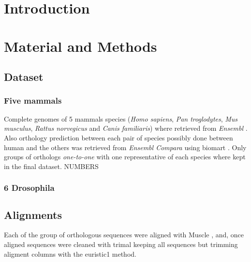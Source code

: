 

\section{Introduction}

\section{Material and Methods}

\subsection{Dataset}

\subsubsection{Five mammals}

Complete genomes of 5 mammals species (\textit{Homo sapiens}, \textit{Pan troglodytes}, \textit{Mus musculus}, \textit{Rattus norvegicus} and \textit{Canis familiaris}) where retrieved from \textit{Ensembl} \cite{Flicek2011}. Also orthology prediction between each pair of species
possibly done between human and the others was retrieved from \textit{Ensembl Compara} \cite{Vilella2009} using biomart \cite{Kinsella2011}. Only groups of orthologs \textit{one-to-one} with one representative of each species where kept in the final dataset. 
NUMBERS

\subsubsection{6 Drosophila}

\subsection{Alignments}
Each of the group of orthologous sequences were aligned with Muscle \cite{Edgar2004}, and, once aligned sequences were cleaned with trimal \cite{Capella-Gutierrez2009} keeping all sequences but trimming aligment columns with the euristic1 method.



